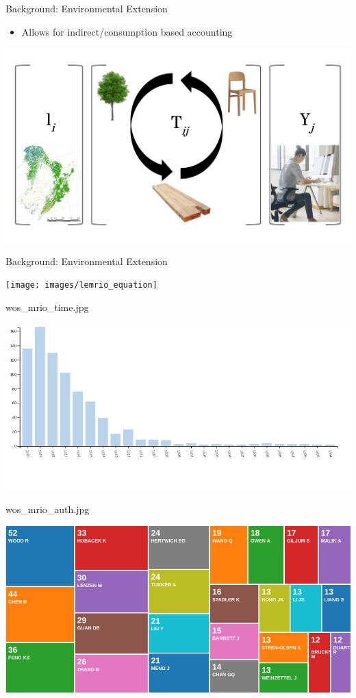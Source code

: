 \documentclass{beamer}
\begin{document}
\begin{frame}{Background: Environmental Extension}

\begin{itemize}
\item
  Allows for indirect/consumption based accounting
\end{itemize}

\begin{center}\includegraphics[width=0.5\linewidth]{images/lemrio} \end{center}

\end{frame}

\begin{frame}{Background: Environmental Extension}

\begin{center}\texttt{[image: images/lemrio\_equation]} \end{center}

\end{frame}

\begin{frame}{wos\_mrio\_time.jpg}

\begin{center}\includegraphics[width=0.5\linewidth]{images/wos_mrio_time} \end{center}

\end{frame}

\begin{frame}{wos\_mrio\_auth.jpg}

\begin{center}\includegraphics[width=0.5\linewidth]{images/wos_mrio_auth} \end{center}

\end{frame}
\end{document}
